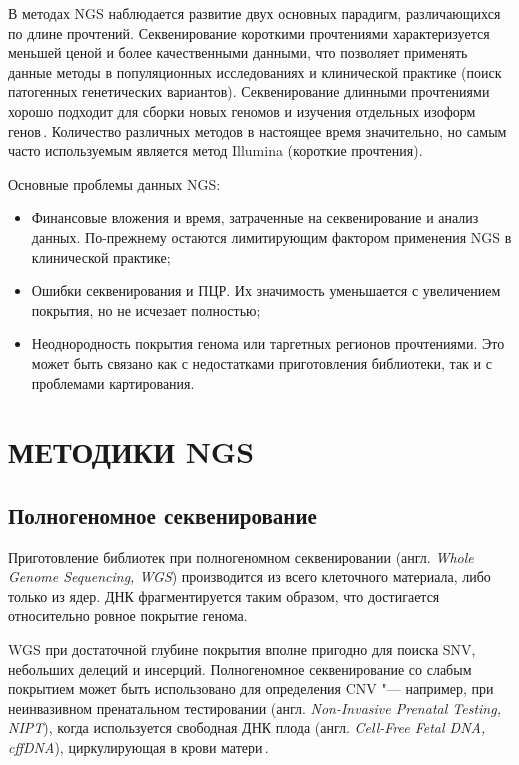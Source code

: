 \documentclass[12pt, twoside, a4paper]{article}
\newcommand{\engterm}[1]{англ. \textenglish{\textit{#1}}}
\begin{document}
В методах NGS наблюдается развитие двух основных парадигм, различающихся по длине прочтений.
Секвенирование короткими прочтениями характеризуется меньшей ценой и более качественными данными, что позволяет применять данные методы в популяционных исследованиях и клинической практике (поиск патогенных генетических вариантов).
Секвенирование длинными прочтениями хорошо подходит для сборки новых геномов и изучения отдельных изоформ генов\,\cite{Goodwin_2016}.
Количество различных методов в настоящее время значительно, но самым часто используемым является метод Illumina (короткие прочтения).

Основные проблемы данных NGS:

\begin{itemize}
	\item Финансовые вложения и время, затраченные на секвенирование и анализ данных.
	      По-прежнему остаются лимитирующим фактором применения NGS в клинической практике;
	\item Ошибки секвенирования и ПЦР.
	      Их значимость уменьшается с увеличением покрытия, но не исчезает полностью;
	\item Неоднородность покрытия генома или таргетных регионов прочтениями.
	      Это может быть связано как с недостатками приготовления библиотеки, так и с проблемами картирования.
\end{itemize}

\section*{МЕТОДИКИ NGS}

\subsection*{Полногеномное секвенирование}

Приготовление библиотек при полногеномном секвенировании (\engterm{Whole Genome Sequencing, WGS}) производится из всего клеточного материала, либо только из ядер.
ДНК фрагментируется таким образом, что достигается относительно ровное покрытие генома.

WGS при достаточной глубине покрытия вполне пригодно для поиска SNV, небольших делеций и инсерций.
Полногеномное секвенирование со слабым покрытием может быть использовано для определения CNV "--- например, при неинвазивном пренатальном тестировании (\engterm{Non-Invasive Prenatal Testing, NIPT}), когда используется свободная ДНК плода (\engterm{Cell-Free Fetal DNA, cffDNA}), циркулирующая в крови матери\,\cite{Yu_2019}.
\end{document}
